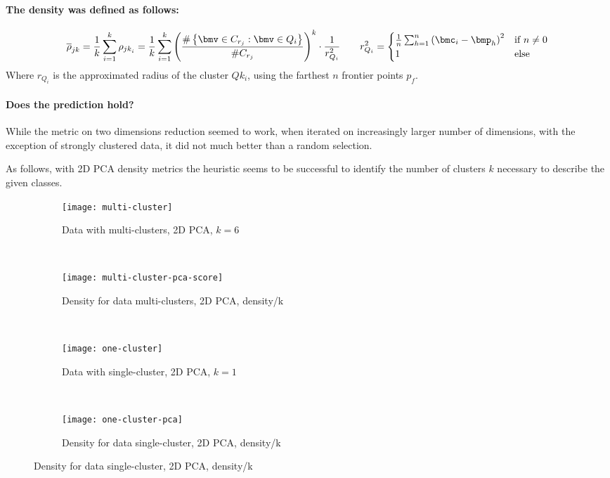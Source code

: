 \documentclass[\main/main.tex]{subfiles}
\begin{document}
\paragraph*{The density was defined as follows:}
\[
	\bar{\rho}_{jk} = \frac{1}{k} \sum_{i=1}^k \rho_{{jk}_i} = \frac{1}{k} \sum_{i=1}^k \rnd{\frac{\arity{\bmv \in C_{r_j}:\bmv \in Q_i}}{\#C_{r_j}}}^k \cdot \frac{1}{r_{Q_i}^2} \qquad r_{Q_i}^2 = \begin{cases}
		\frac{1}{n} \sum_{h=1}^{n} {(\bmc_i - \bmp_h)}^2 & \text{if \(n \neq 0\)} \\
		1                                                & \text{else}
	\end{cases}
\]
Where \(r_{Q_i}\) is the approximated radius of the cluster \(Qk_i\), using the farthest \(n\) frontier points \(p_f\).

\paragraph*{Does the prediction hold?}
While the metric on two dimensions reduction seemed to work, when iterated on increasingly larger number of dimensions, with the exception of strongly clustered data, it did not much better than a random selection.

As follows, with 2D PCA density metrics the heuristic seems to be successful to identify the number of clusters \(k\) necessary to describe the given classes.
\begin{figure}
	\begin{subfigure}{0.24\textwidth}
		\texttt{[image: multi-cluster]}
		\caption{Data with multi-clusters, 2D PCA, \(k=6\)}
	\end{subfigure}
	~
	\begin{subfigure}{0.24\textwidth}
		\texttt{[image: multi-cluster-pca-score]}
		\caption{Density for data multi-clusters, 2D PCA, density/k}
	\end{subfigure}
	~
	\begin{subfigure}{0.24\textwidth}
		\texttt{[image: one-cluster]}
		\caption{Data with single-cluster, 2D PCA, \(k=1\)}
	\end{subfigure}
	~
	\begin{subfigure}{0.24\textwidth}
		\texttt{[image: one-cluster-pca]}
		\caption{Density for data single-cluster, 2D PCA, density/k}
	\end{subfigure}
\end{figure}
\end{document}
